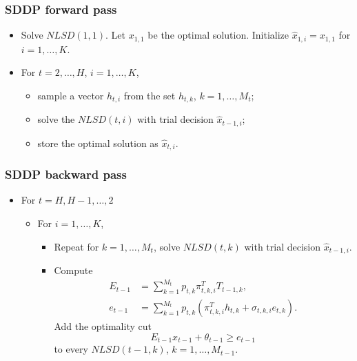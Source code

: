 \documentclass{beamer}
\begin{document}
\begin{frame}
\frametitle{SDDP forward pass}

\begin{itemize}
	\item 
Solve $NLSD(1, 1)$. Let $x_{1,1}$ be the optimal solution.
Initialize $\hat{x}_{1,i} = x_{1,1}$ for $i = 1,\ldots,K$.
\item
For $t = 2,\ldots, H$, $i = 1,\ldots, K$,
\begin{itemize}
	\item 
sample a vector $h_{t,i}$ from the set $h_{t,k}$, $k = 1,\ldots,M_t$;
\item
solve the $NLSD(t, i)$ with trial decision $\hat{x}_{t-1,i}$;
\item
store the optimal solution as $\hat{x}_{t,i}$.
\end{itemize}
\end{itemize}

\end{frame}

\begin{frame}
	\frametitle{SDDP backward pass}

\begin{itemize}
	\item 
For $t = H, H - 1,\ldots, 2$
\begin{itemize}
	\item 
For $i = 1,\ldots, K$,
\begin{itemize}
	\item 
Repeat for $k = 1,\ldots, M_t$, solve $NLSD(t, k)$ with trial decision $\hat{x}_{t-1,i}$.
\item
Compute
\begin{align*}
E_{t-1} &= \sum_{k = 1}^{M_t} p_{t,k} \pi_{t,k,i}^T T_{t-1,k}, \\
e_{t-1} &= \sum_{k = 1}^{M_t} p_{t,k} \left( \pi_{t,k,i}^T h_{t,k} + \sigma_{t,k,i} e_{t,k} \right).
\end{align*}
Add the optimality cut
$$
E_{t-1}x_{t-1} + \theta_{t-1} \geq e_{t-1}
$$
to every $NLSD(t - 1, k)$, $k = 1,\ldots, M_{t-1}$.
\end{itemize}	
\end{itemize}	
\end{itemize}	

\end{frame}
\end{document}
